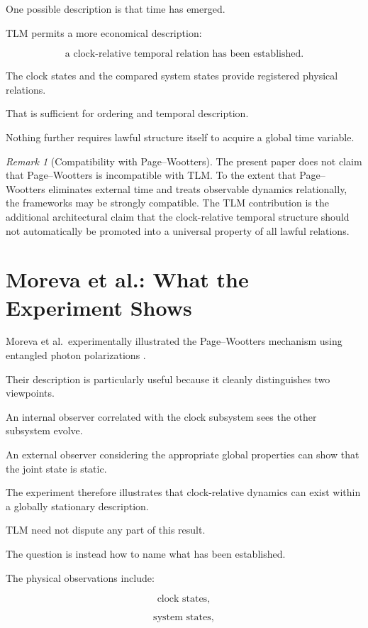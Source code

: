 \documentclass[12pt,onecolumn]{article}
\theoremstyle{plain}
\theoremstyle{definition}
\theoremstyle{remark}
\newtheorem{remark}{Remark}
\begin{document}
One possible description is that time has emerged.

TLM permits a more economical description:

\[
\boxed{
\text{a clock-relative temporal relation has been established}.
}
\]

The clock states and the compared system states provide registered physical
relations.

That is sufficient for ordering and temporal description.

Nothing further requires lawful structure itself to acquire a global time
variable.

\begin{remark}[Compatibility with Page--Wootters]
The present paper does not claim that Page--Wootters is incompatible with
TLM. To the extent that Page--Wootters eliminates external time and treats
observable dynamics relationally, the frameworks may be strongly
compatible. The TLM contribution is the additional architectural claim
that the clock-relative temporal structure should not automatically be
promoted into a universal property of all lawful relations.
\end{remark}


\section{Moreva et al.: What the Experiment Shows}

Moreva et al.\ experimentally illustrated the Page--Wootters mechanism
using entangled photon polarizations \cite{moreva2014}.

Their description is particularly useful because it cleanly distinguishes
two viewpoints.

An internal observer correlated with the clock subsystem sees the other
subsystem evolve.

An external observer considering the appropriate global properties can
show that the joint state is static.

The experiment therefore illustrates that clock-relative dynamics can
exist within a globally stationary description.

TLM need not dispute any part of this result.

The question is instead how to name what has been established.

The physical observations include:

\[
\text{clock states},
\]

\[
\text{system states},
\]
\end{document}
